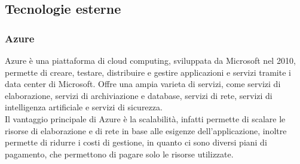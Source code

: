 \subsection{Tecnologie esterne}
\subsubsection{Azure}
Azure è una piattaforma di cloud computing, sviluppata da Microsoft nel 2010, permette di creare, testare, distribuire e gestire applicazioni e servizi tramite i data center di Microsoft.
Offre una ampia varieta di servizi, come servizi di elaborazione, servizi di archiviazione e database, servizi di rete, servizi di intelligenza artificiale e servizi di sicurezza.\\
Il vantaggio principale di Azure è la scalabilità, infatti permette di scalare le risorse di elaborazione e di rete in base alle esigenze dell'applicazione, inoltre permette di ridurre i costi di gestione, in quanto
ci sono diversi piani di pagamento, che permettono di pagare solo le risorse utilizzate.\\
